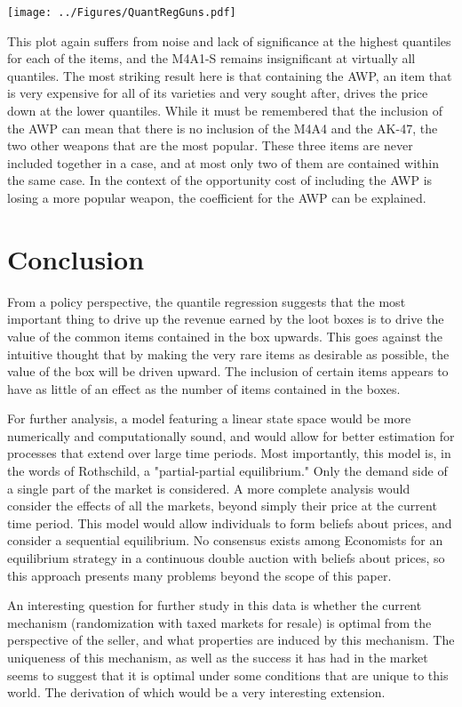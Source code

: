 \documentclass[12pt, letterpaper]{paper}
\begin{document}
\texttt{[image: ../Figures/QuantRegGuns.pdf]} 

This plot again suffers from noise and lack of significance at the
highest quantiles for each of the items, and the M4A1-S remains
insignificant at virtually all quantiles. The most striking result
here is that containing the AWP, an item that is very expensive for
all of its varieties and very sought after, drives the price down at
the lower quantiles. While it must be remembered that the inclusion of
the AWP can mean that there is no inclusion of the M4A4 and the AK-47,
the two other weapons that are the most popular. These three items are
never included together in a case, and at most only two of them are
contained within the same case. In the context of the opportunity cost
of including the AWP is losing a more popular weapon, the coefficient
for the AWP can be explained.


\section{Conclusion}
\label{sec-5}

From a policy perspective, the quantile regression suggests that the
most important thing to drive up the revenue earned by the loot boxes
is to drive the value of the common items contained in the box
upwards. This goes against the intuitive thought that by making the
very rare items as desirable as possible, the value of the box will be
driven upward. The inclusion of certain items appears to have as
little of an effect as the number of items contained in the boxes.

For further analysis, a model featuring a linear state space would be
more numerically and computationally sound, and would allow for better
estimation for processes that extend over large time periods. Most
importantly, this model is, in the words of Rothschild, a
"partial-partial equilibrium." \cite{Rothschild} Only the demand side of a
single part of the market is considered. A more complete analysis
would consider the effects of all the markets, beyond simply their
price at the current time period. This model would allow individuals
to form beliefs about prices, and consider a sequential
equilibrium. No consensus exists among Economists for an
equilibrium strategy in a continuous double auction with beliefs about
prices, so this approach presents many problems beyond the scope of
this paper. \cite{DoubleAuc}

An interesting question for further study in this data is whether the
current mechanism (randomization with taxed markets for resale) is
optimal from the perspective of the seller, and what properties are
induced by this mechanism. The uniqueness of this mechanism, as well
as the success it has had in the market seems to suggest that it is
optimal under some conditions that are unique to this world. The
derivation of which would be a very interesting extension.
\end{document}
